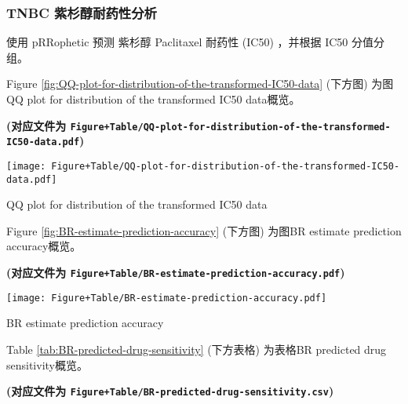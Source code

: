 \documentclass[
]{article}
\begin{document}
\hypertarget{tnbc-ux7d2bux6749ux9187ux8010ux836fux6027ux5206ux6790}{%
\subsubsection{TNBC 紫杉醇耐药性分析}\label{tnbc-ux7d2bux6749ux9187ux8010ux836fux6027ux5206ux6790}}

使用 pRRophetic 预测 紫杉醇 Paclitaxel 耐药性 (IC50) ，并根据 IC50 分值分组。

Figure \ref{fig:QQ-plot-for-distribution-of-the-transformed-IC50-data} (下方图) 为图QQ plot for distribution of the transformed IC50 data概览。

\textbf{(对应文件为 \texttt{Figure+Table/QQ-plot-for-distribution-of-the-transformed-IC50-data.pdf})}

\def\@captype{figure}
\begin{center}
\texttt{[image: Figure+Table/QQ-plot-for-distribution-of-the-transformed-IC50-data.pdf]}
\caption{QQ plot for distribution of the transformed IC50 data}\label{fig:QQ-plot-for-distribution-of-the-transformed-IC50-data}
\end{center}

Figure \ref{fig:BR-estimate-prediction-accuracy} (下方图) 为图BR estimate prediction accuracy概览。

\textbf{(对应文件为 \texttt{Figure+Table/BR-estimate-prediction-accuracy.pdf})}

\def\@captype{figure}
\begin{center}
\texttt{[image: Figure+Table/BR-estimate-prediction-accuracy.pdf]}
\caption{BR estimate prediction accuracy}\label{fig:BR-estimate-prediction-accuracy}
\end{center}

Table \ref{tab:BR-predicted-drug-sensitivity} (下方表格) 为表格BR predicted drug sensitivity概览。

\textbf{(对应文件为 \texttt{Figure+Table/BR-predicted-drug-sensitivity.csv})}
\end{document}
